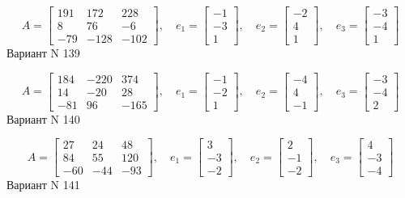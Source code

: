 \documentclass[11pt]{report}
\begin{document}
$$A = \left[\begin{matrix}191 & 172 & 228\\8 & 76 & -6\\-79 & -128 & -102\end{matrix}\right],\quad e_1 = \left[\begin{matrix}-1\\-3\\1\end{matrix}\right],\quad e_2 = \left[\begin{matrix}-2\\4\\1\end{matrix}\right],\quad e_3 = \left[\begin{matrix}-3\\-4\\1\end{matrix}\right]$$Вариант N 139

$$A = \left[\begin{matrix}184 & -220 & 374\\14 & -20 & 28\\-81 & 96 & -165\end{matrix}\right],\quad e_1 = \left[\begin{matrix}-1\\-2\\1\end{matrix}\right],\quad e_2 = \left[\begin{matrix}-4\\4\\-1\end{matrix}\right],\quad e_3 = \left[\begin{matrix}-3\\-4\\2\end{matrix}\right]$$Вариант N 140

$$A = \left[\begin{matrix}27 & 24 & 48\\84 & 55 & 120\\-60 & -44 & -93\end{matrix}\right],\quad e_1 = \left[\begin{matrix}3\\-3\\-2\end{matrix}\right],\quad e_2 = \left[\begin{matrix}2\\-1\\-2\end{matrix}\right],\quad e_3 = \left[\begin{matrix}4\\-3\\-4\end{matrix}\right]$$Вариант N 141
\end{document}
